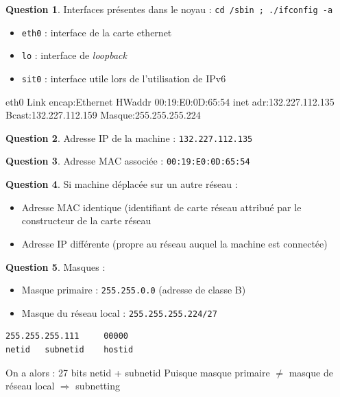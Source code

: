 \documentclass[11pt,english,french]{scrreprt}
\theoremstyle{remark}
\theoremstyle{definition}
\newtheorem{ques*}{Question}[subsection]
\begin{document}
\begin{ques*}
Interfaces présentes dans le noyau : \lstinline!cd /sbin ; ./ifconfig -a! \begin{itemize}
	\item \lstinline!eth0! : interface de la carte ethernet
	\item \lstinline!lo! : interface de \emph{loopback}
	\item \lstinline!sit0! : interface utile lors de l'utilisation de IPv6
\end{itemize}
\end{ques*}

\begin{verbatimtab}[4]	
eth0	Link encap:Ethernet		HWaddr 00:19:E0:0D:65:54  
		inet adr:132.227.112.135	Bcast:132.227.112.159	Masque:255.255.255.224
\end{verbatimtab}

\begin{ques*}
Adresse IP de la machine : \lstinline!132.227.112.135!
\end{ques*}

\begin{ques*}
Adresse MAC associée : \lstinline!00:19:E0:0D:65:54!
\end{ques*}

\begin{ques*}
Si machine déplacée sur un autre réseau :\begin{itemize}
	\item Adresse MAC identique (identifiant de carte réseau attribué par le constructeur de la carte réseau
	\item Adresse IP différente (propre au réseau auquel la machine est connectée)
\end{itemize}
\end{ques*}
	
\begin{ques*}
Masques :\begin{itemize}
	\item Masque primaire : \lstinline!255.255.0.0! (adresse de classe B)
	\item Masque du réseau local : \lstinline!255.255.255.224/27!
\end{itemize}

\begin{lstlisting}	
255.255.255.111		00000
netid	subnetid	hostid
\end{lstlisting}

On a alors : 27 bits netid + subnetid
Puisque masque primaire $\neq$ masque de réseau local $\Rightarrow$ subnetting
\end{ques*}
\end{document}
